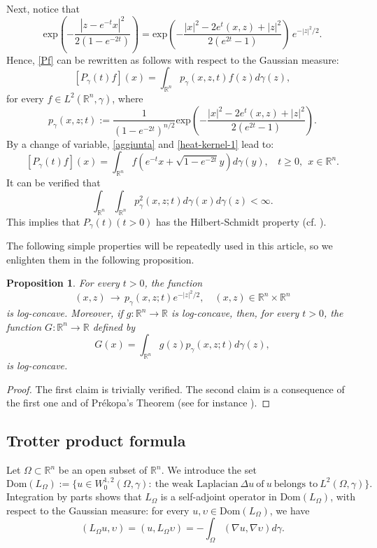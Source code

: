 \documentclass[12pt]{amsart}
\newtheorem{proposition}[theorem]{Proposition}
\newcommand{\R}{\mathbb R}
\newcommand{\1}{\mathbf 1}
\begin{document}
Next, notice that
\begin{equation}\label{kernels relation}
\mbox{exp} \left( -\frac{|z-e^{-t}x|^2}{2(1-e^{-2t})}\right)=
\text{exp} \left( -\frac{|x|^2-2e^t (x,z)+|z|^2}{2(e^{2t}-1)}\right)\,e^{-|z|^2/2}.
\end{equation}
Hence, \eqref{Pf} can be rewritten as follows with respect to the Gaussian measure:
\begin{equation}\label{aggiunta}
[P_\gamma(t)f](x)=\int_{\R^n}p_{\gamma}(x,z,t)f(z)d\gamma(z),
\end{equation}
for every $f\in L^2(\R^n,\gamma)$, where
\begin{equation}\label{heat-kernel-1}
p_\gamma(x,z;t):= \frac{1}{(1-e^{-2t})^{n/2}} \text{exp} \left( -\frac{|x|^2-2e^t (x,z)+|z|^2}{2(e^{2t}-1)}\right).
\end{equation}
By a change of variable, \eqref{aggiunta} and \eqref{heat-kernel-1} lead to:
\[
[P_\gamma(t)f](x)=\int_{\R^n}f(e^{-t}x+\sqrt{1-e^{-2t}}y) d\gamma(y), \ \ \ \ t\geq 0,\ \ x\in \R^n.
\]
It can be verified that
\begin{equation}
\int_{\R^n}\int_{\R^n} p_\gamma^2(x,z;t)d\gamma(x)d\gamma(z)<\infty.
\end{equation}
This implies that $P_\gamma(t)(t>0)$ has the Hilbert-Schmidt property (cf. \cite[p.104 and Section A.6, p.483]{Book-Markov-Diffu}).

The following simple properties will be repeatedly used in this article, so we enlighten them in the following proposition.
\begin{proposition}\label{log-concavity proposition} For every $t>0$, the function
$$
(x,z)\, \rightarrow\,p_\gamma (x,z;t) e^{-|z|^2/2},\quad(x,z)\in\R^n\times\R^n
$$
is log-concave. Moreover, if $g\colon\R^n\to\R$ is log-concave, then, for every $t>0$, the function $G\colon\R^n\to\R$ defined by
$$
G(x)=\int_{\R^n} g(z)p_\gamma(x,z;t)d\gamma(z),
$$
is log-concave.
\end{proposition}

\begin{proof}
The first claim is trivially verified. The second claim is a consequence of the first one and of Pr\'ekopa's Theorem (see for instance \cite[Corollary 3.5 ]{BL76}).
\end{proof}


\subsection{Trotter product formula}\label{Se3-1}
Let $\Omega\subset \R^n$ be an open subset of $\R^n$. We introduce the set
$$
\text{Dom}(L_\Omega):=\{ u\in W^{1,2}_0(\Omega,\gamma):\ \text{the\ weak\ Laplacian}\ \Delta u\ \text{of}\ u\ \text{belongs\ to}\ L^2(\Omega,\gamma)\}.
$$
Integration by parts shows that $L_\Omega$ is a self-adjoint operator in $\text{Dom}(L_\Omega)$, with respect to the Gaussian measure: for every $u,\upsilon \in \text{Dom}(L_\Omega)$, we have
\[
(L_\Omega u,\upsilon)=(u,L_\Omega \upsilon)=-\int_{\Omega}(\nabla u, \nabla \upsilon) d\gamma.
\]
\end{document}
